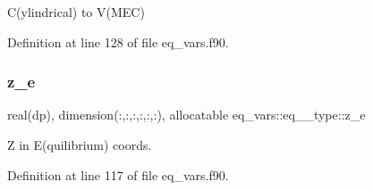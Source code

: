 C(ylindrical) to V(\+M\+E\+C) 



Definition at line 128 of file eq\+\_\+vars.\+f90.

\mbox{\label{structeq__vars_1_1eq__2__type_aad08fbb13ba950f7d74a55bc3ffad635}} 
\subsubsection{\texorpdfstring{z\+\_\+e}{z\_e}}
{\footnotesize\ttfamily real(dp), dimension(\+:,\+:,\+:,\+:,\+:,\+:), allocatable eq\+\_\+vars\+::eq\+\_\+\_\+type\+::z\+\_\+e}



Z in E(quilibrium) coords. 



Definition at line 117 of file eq\+\_\+vars.\+f90.




